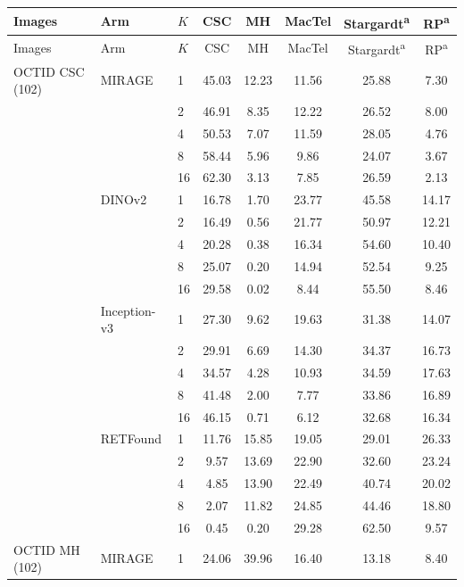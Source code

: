 \begin{longtable}{@{}lllccccc@{}}
\toprule
Images & Arm & $K$ & CSC & MH & MacTel & Stargardt\textsuperscript{a} & RP\textsuperscript{a} \\
\midrule
\endfirsthead
\toprule
Images & Arm & $K$ & CSC & MH & MacTel & Stargardt\textsuperscript{a} & RP\textsuperscript{a} \\
\midrule
\endhead
\bottomrule
\endfoot
\bottomrule
\endlastfoot
OCTID CSC (102) & MIRAGE & 1 & 45.03 & 12.23 & 11.56 & 25.88 & 7.30 \\
 &  & 2 & 46.91 & 8.35 & 12.22 & 26.52 & 8.00 \\
 &  & 4 & 50.53 & 7.07 & 11.59 & 28.05 & 4.76 \\
 &  & 8 & 58.44 & 5.96 & 9.86 & 24.07 & 3.67 \\
 &  & 16 & 62.30 & 3.13 & 7.85 & 26.59 & 2.13 \\
\addlinespace[1pt]
 & DINOv2 & 1 & 16.78 & 1.70 & 23.77 & 45.58 & 14.17 \\
 &  & 2 & 16.49 & 0.56 & 21.77 & 50.97 & 12.21 \\
 &  & 4 & 20.28 & 0.38 & 16.34 & 54.60 & 10.40 \\
 &  & 8 & 25.07 & 0.20 & 14.94 & 52.54 & 9.25 \\
 &  & 16 & 29.58 & 0.02 & 8.44 & 55.50 & 8.46 \\
\addlinespace[1pt]
 & Inception-v3 & 1 & 27.30 & 9.62 & 19.63 & 31.38 & 14.07 \\
 &  & 2 & 29.91 & 6.69 & 14.30 & 34.37 & 16.73 \\
 &  & 4 & 34.57 & 4.28 & 10.93 & 34.59 & 17.63 \\
 &  & 8 & 41.48 & 2.00 & 7.77 & 33.86 & 16.89 \\
 &  & 16 & 46.15 & 0.71 & 6.12 & 32.68 & 16.34 \\
\addlinespace[1pt]
 & RETFound & 1 & 11.76 & 15.85 & 19.05 & 29.01 & 26.33 \\
 &  & 2 & 9.57 & 13.69 & 22.90 & 32.60 & 23.24 \\
 &  & 4 & 4.85 & 13.90 & 22.49 & 40.74 & 20.02 \\
 &  & 8 & 2.07 & 11.82 & 24.85 & 44.46 & 18.80 \\
 &  & 16 & 0.45 & 0.20 & 29.28 & 62.50 & 9.57 \\
\addlinespace[1pt]
OCTID MH (102) & MIRAGE & 1 & 24.06 & 39.96 & 16.40 & 13.18 & 8.40 \\

\end{longtable}
